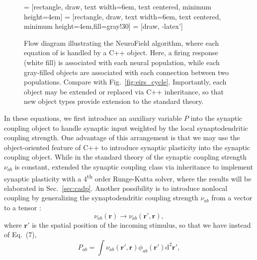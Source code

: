 \documentclass[preprint,review,10pt,authoryear,letterpaper]{elsarticle}
\begin{document}
\begin{figure}
\begin{center}
 = [rectangle, draw, text width=6em, text centered, minimum height=4em]
 = [rectangle, draw, text width=6em, text centered, minimum height=4em,fill=gray!30]
 = [draw, -latex']    
\caption{Flow diagram illustrating the NeuroField algorithm, where each equation of \citet{Robinson2005} is handled by a C++ object. Here, a firing response (white fill) is associated with each neural population, while each gray-filled objects are associated with each connection between two populations. Compare with Fig.~\ref{fig:eirs_cycle}. Importantly, each object may be extended or replaced via C++ inheritance, so that new object types provide extension to the standard \citet{Robinson2005} theory.}
\label{fig:components}
\end{center}
\end{figure}

In these equations, we first introduce an auxiliary variable \(P\) into the synaptic coupling object to handle synaptic input weighted by the local synaptodendritic coupling strength. One advantage of this arrangement is that we may use the object-oriented feature of C++ to introduce synaptic plasticity into the synaptic coupling object. While in the standard theory of \citet{Robinson2005} the synaptic coupling strength \(\nu_{ab}\) is constant, \citet{fung13,fung14} extended the synaptic coupling class via inheritance to implement synaptic plasticity with a 4\textsuperscript{th} order Runge-Kutta solver, where the results will be elaborated in Sec.~\ref{sec:cadp}. Another possibility is to introduce nonlocal coupling by generalizing the synaptodendritic coupling strength \(\nu_{ab}\) from a vector to a tensor \citep{fung14}:
\begin{equation}
	\nu_{ab}(\mathbf{r}) \rightarrow \nu_{ab}(\mathbf{r}',\mathbf{r}),
\end{equation}
where \(\mathbf{r}'\) is the spatial position of the incoming stimulus, so that we have instead of Eq.~(7),
\begin{equation}
	P_{ab} = \int \nu_{ab}(\mathbf{r}',\mathbf{r}) \phi_{ab}(\mathbf{r}') \mathrm{d^2\mathbf{r}'},
\end{equation}
\end{document}
